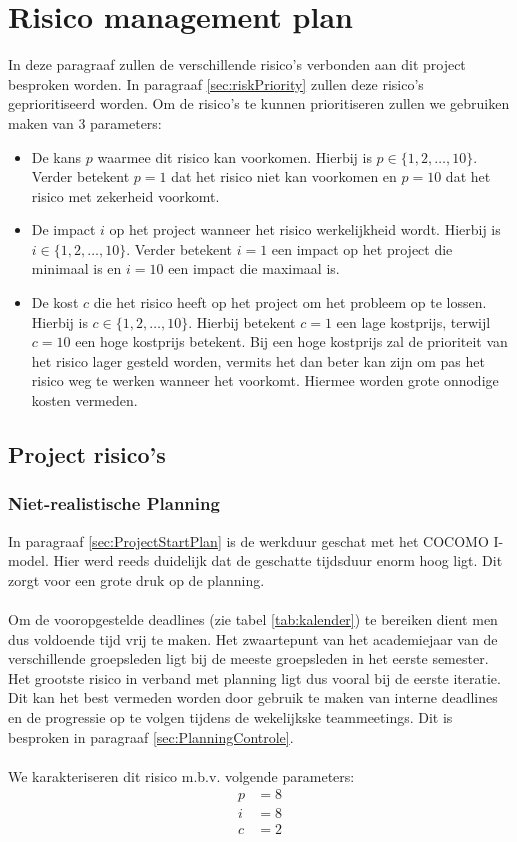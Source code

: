 \section{Risico management plan} \label{sec:risicoManagementPlan}
In deze paragraaf zullen de verschillende risico's verbonden aan dit project besproken worden. In paragraaf \ref{sec:riskPriority} zullen deze risico's geprioritiseerd worden. Om de risico's te kunnen prioritiseren zullen we gebruiken maken van 3 parameters:
\begin{itemize}
	\item 
		De kans $p$ waarmee dit risico kan voorkomen. Hierbij is $ p \in \{1, 2, \ldots , 10\} $. Verder betekent $p = 1$ dat het risico niet kan voorkomen en $p = 10$ dat het risico met zekerheid voorkomt.
	\item 
		De impact $i$ op het project wanneer het risico werkelijkheid wordt. Hierbij is $ i \in \{1, 2, \ldots , 10\} $. Verder betekent $i = 1$ een impact op het project die minimaal is en $i = 10$ een impact die maximaal is.
	\item 
		De kost $c$ die het risico heeft op het project om het probleem op te lossen. Hierbij is $ c \in \{1, 2, \ldots , 10\} $. Hierbij betekent $c = 1$ een lage kostprijs, terwijl $c=10$ een hoge kostprijs betekent. Bij een hoge kostprijs zal de prioriteit van het risico lager gesteld worden, vermits het dan beter kan zijn om pas het risico weg te werken wanneer het voorkomt. Hiermee worden grote onnodige kosten vermeden.
		
\end{itemize}
\subsection{Project risico's}
\subsubsection{Niet-realistische Planning}
In paragraaf \ref{sec:ProjectStartPlan} is de werkduur geschat met het COCOMO I-model. Hier werd reeds duidelijk dat de geschatte tijdsduur enorm hoog ligt. Dit zorgt voor een grote druk op de planning.
\\
\\
Om de vooropgestelde deadlines (zie tabel \ref{tab:kalender}) te bereiken dient men dus voldoende tijd vrij te maken. Het zwaartepunt van het academiejaar van de verschillende groepsleden ligt bij de meeste groepsleden in het eerste semester. Het grootste risico in verband met planning ligt dus vooral bij de eerste iteratie. Dit kan het best vermeden worden door gebruik te maken van interne deadlines en de progressie op te volgen tijdens de wekelijkske teammeetings. Dit is besproken in paragraaf \ref{sec:PlanningControle}.
\\
\\
We karakteriseren dit risico m.b.v. volgende parameters:
\begin{align*}
	p &= 8\\
	i &= 8\\
	c &= 2
\end{align*}

